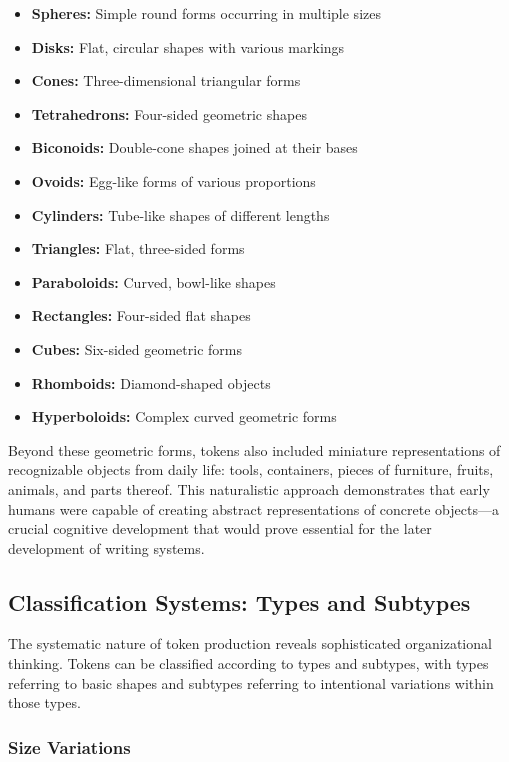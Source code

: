 \documentclass[12pt, oneside, openany]{book}
\begin{document}
\begin{itemize}
	\item \textbf{Spheres:} Simple round forms occurring in multiple sizes
	\item \textbf{Disks:} Flat, circular shapes with various markings
	\item \textbf{Cones:} Three-dimensional triangular forms
	\item \textbf{Tetrahedrons:} Four-sided geometric shapes
	\item \textbf{Biconoids:} Double-cone shapes joined at their bases
	\item \textbf{Ovoids:} Egg-like forms of various proportions
	\item \textbf{Cylinders:} Tube-like shapes of different lengths
	\item \textbf{Triangles:} Flat, three-sided forms
	\item \textbf{Paraboloids:} Curved, bowl-like shapes
	\item \textbf{Rectangles:} Four-sided flat shapes
	\item \textbf{Cubes:} Six-sided geometric forms
	\item \textbf{Rhomboids:} Diamond-shaped objects
	\item \textbf{Hyperboloids:} Complex curved geometric forms
\end{itemize}
Beyond these geometric forms, tokens also included miniature representations of recognizable objects from daily life: tools, containers, pieces of furniture, fruits, animals, and parts thereof. This naturalistic approach demonstrates that early humans were capable of creating abstract representations of concrete objects—a crucial cognitive development that would prove essential for the later development of writing systems.

\subsection{Classification Systems: Types and Subtypes}

The systematic nature of token production reveals sophisticated organizational thinking. Tokens can be classified according to types and subtypes, with types referring to basic shapes and subtypes referring to intentional variations within those types.

\subsubsection{Size Variations}
\end{document}

